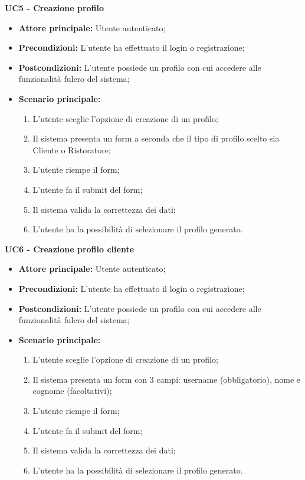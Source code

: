 \textbf{UC5 - Creazione profilo}
\begin{itemize}
    \item \textbf{Attore principale: }Utente autenticato;
    \item \textbf{Precondizioni: }L'utente ha effettuato il login o registrazione;
    \item \textbf{Postcondizioni: }L'utente possiede un profilo con cui accedere alle funzionalità fulcro del sistema;
    \item \textbf{Scenario principale:}
        \begin{enumerate}
            \item L'utente sceglie l'opzione di creazione di un profilo;
            \item Il sistema presenta un form a seconda che il tipo di profilo scelto sia Cliente o Ristoratore;
            \item L'utente riempe il form;
            \item L'utente fa il submit del form;
            \item Il sistema valida la correttezza dei dati;
            \item L'utente ha la possibilità di selezionare il profilo generato.
        \end{enumerate}
\end{itemize}

\textbf{UC6 - Creazione profilo cliente}
\begin{itemize}
    \item \textbf{Attore principale: }Utente autenticato;
    \item \textbf{Precondizioni: }L'utente ha effettuato il login o registrazione;
    \item \textbf{Postcondizioni: }L'utente possiede un profilo con cui accedere alle funzionalità fulcro del sistema;
    \item \textbf{Scenario principale:}
        \begin{enumerate}
            \item L'utente sceglie l'opzione di creazione di un profilo;
            \item Il sistema presenta un form con 3 campi: username (obbligatorio), nome e cognome (facoltativi);
            \item L'utente riempe il form;
            \item L'utente fa il submit del form;
            \item Il sistema valida la correttezza dei dati;
            \item L'utente ha la possibilità di selezionare il profilo generato.
        \end{enumerate}
\end{itemize}

